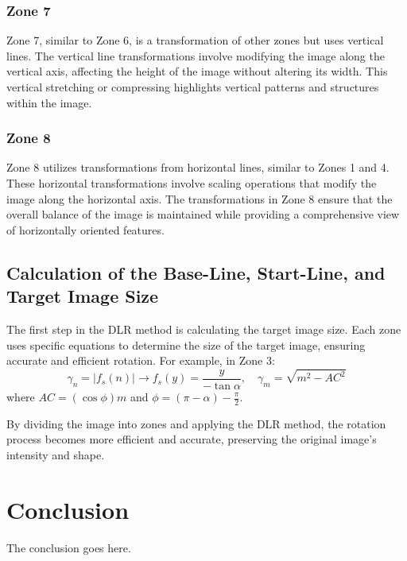\documentclass[conference]{IEEEtran}
\begin{document}
\subsubsection{Zone 7}
Zone 7, similar to Zone 6, is a transformation of other zones but uses vertical lines. The vertical line transformations involve modifying the image along the vertical axis, affecting the height of the image without altering its width. This vertical stretching or compressing highlights vertical patterns and structures within the image.
\subsubsection{Zone 8}
Zone 8 utilizes transformations from horizontal lines, similar to Zones 1 and 4. These horizontal transformations involve scaling operations that modify the image along the horizontal axis. The transformations in Zone 8 ensure that the overall balance of the image is maintained while providing a comprehensive view of horizontally oriented features.

\subsection{Calculation of the Base-Line, Start-Line, and Target Image Size}

The first step in the DLR method is calculating the target image size. Each zone uses specific equations to determine the size of the target image, ensuring accurate and efficient rotation. For example, in Zone 3:
\[
\gamma_n = \left| f_s(n) \right| \rightarrow f_s(y) = \frac{y}{-\tan \alpha}, \quad \gamma_m = \sqrt{m^2 - AC^2}
\]
where \( AC = (\cos \phi)m \) and \( \phi = (\pi - \alpha) - \frac{\pi}{2} \).

By dividing the image into zones and applying the DLR method, 
the rotation process becomes more efficient and accurate, 
preserving the original image's intensity and shape.




\section{Conclusion}
The conclusion goes here.






\end{document}
